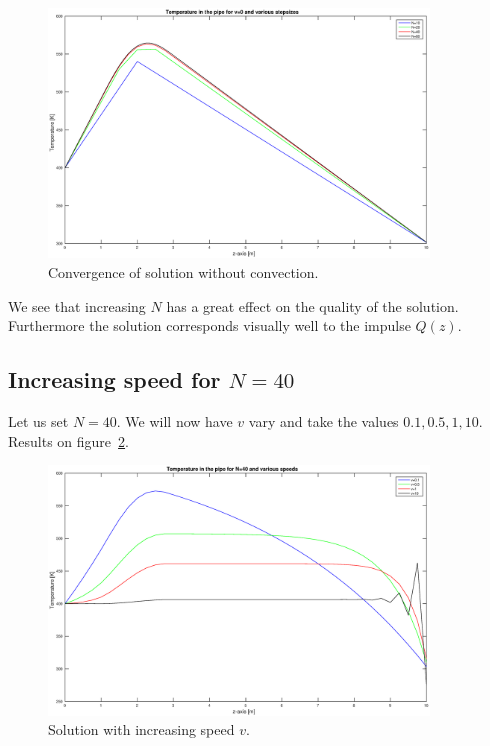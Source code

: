 \documentclass[11pt,a4paper]{report}
\begin{document}
\begin{figure}[!h]
\centering
\includegraphics[width = 0.9\textwidth]{./fig1.eps}
\caption{Convergence of solution without convection.}
\label{fig:1}
\end{figure}

We see that increasing $N$ has a great effect on the quality of the solution. Furthermore the solution corresponds visually well to the impulse $Q(z)$.

\subsection{Increasing speed for $N=40$}

Let us set $N=40$. We will now have $v$ vary and take the values $0.1, 0.5, 1,10$. Results on figure~\ref{fig:2}.

\begin{figure}[!h]
\centering
\includegraphics[width = 0.9\textwidth]{./fig2.eps}
\caption{Solution with increasing speed $v$.}
\label{fig:2}
\end{figure}
\end{document}

